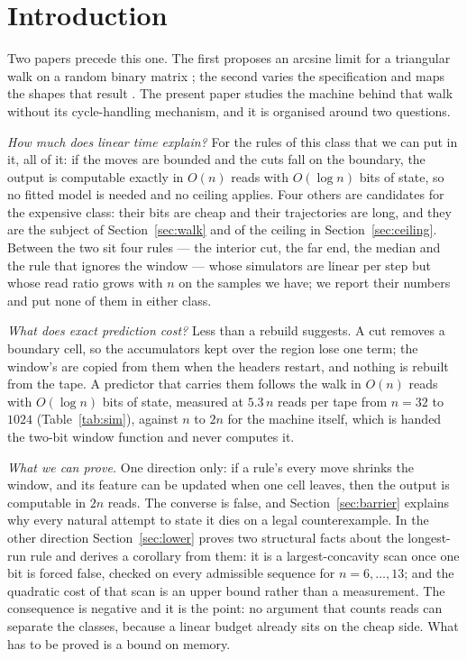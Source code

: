 \documentclass[11pt]{article}
\begin{document}
\section{Introduction}

Two papers precede this one. The first proposes an arcsine limit for a triangular walk on a random
binary matrix \citep{luo-tww}; the second varies the specification and maps the shapes that result
\citep{luo-family}. The present paper studies the machine behind that walk without its
cycle-handling mechanism, and it is organised around two questions.

\emph{How much does linear time explain?} For the rules of this class that we can put in it, all of
it: if the moves are bounded and the cuts fall on the boundary, the output is computable exactly in
$O(n)$ reads with $O(\log n)$ bits of state, so no fitted model is needed and no ceiling applies. Four
others are candidates for the expensive class: their bits are cheap and their trajectories are long,
and they are the subject of Section~\ref{sec:walk} and of the ceiling in
Section~\ref{sec:ceiling}. Between the two sit four rules --- the interior cut, the far end, the
median and the rule that ignores the window --- whose simulators are linear per step but whose read
ratio grows with $n$ on the samples we have; we report their numbers and put none of them in either
class.

\emph{What does exact prediction cost?} Less than a rebuild suggests. A cut removes a boundary
cell, so the accumulators kept over the region lose one term; the window's are copied from them
when the headers restart, and nothing is rebuilt from the tape. A predictor that carries them follows the walk in
$O(n)$ reads with $O(\log n)$ bits of state, measured at $5.3\,n$ reads per tape from $n=32$ to
$1024$ (Table~\ref{tab:sim}), against $n$ to $2n$ for the machine itself, which is handed the two-bit
window function and never computes it.

\emph{What we can prove.} One direction only: if a rule's every move shrinks the window, and its
feature can be updated when one cell leaves, then the output is computable in $2n$ reads. The
converse is false, and Section~\ref{sec:barrier} explains why every natural attempt to state it dies
on a legal counterexample. In the other direction Section~\ref{sec:lower} proves two structural facts about the longest-run
rule and derives a corollary from them: it is a largest-concavity scan once one bit is forced
false, checked on every admissible sequence for $n=6,\dots,13$; and the quadratic cost of that scan
is an upper bound rather than a measurement. The consequence is negative and it is the point:
no argument that counts reads can separate the classes, because a linear budget already sits on the
cheap side. What has to be proved is a bound on memory.
\end{document}
